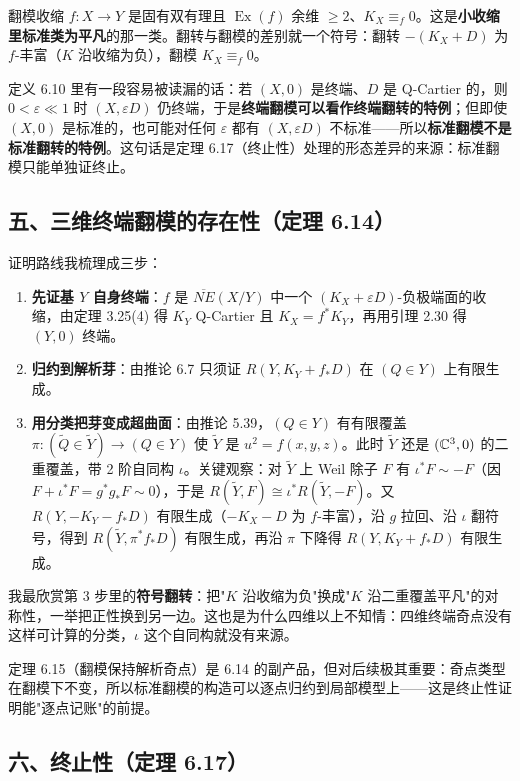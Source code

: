 翻模收缩 $f:X\to Y$ 是固有双有理且 $\operatorname{Ex}(f)$ 余维 $\ge2$、$K_X\equiv_f 0$。这是\textbf{小收缩里标准类为平凡}的那一类。翻转与翻模的差别就一个符号：翻转 $-(K_X+D)$ 为 $f$-丰富（$K$ 沿收缩为负），翻模 $K_X\equiv_f0$。

定义 6.10 里有一段容易被读漏的话：若 $(X,0)$ 是终端、$D$ 是 Q-Cartier 的，则 $0<\varepsilon\ll1$ 时 $(X,\varepsilon D)$ 仍终端，于是\textbf{终端翻模可以看作终端翻转的特例}；但即使 $(X,0)$ 是标准的，也可能对任何 $\varepsilon$ 都有 $(X,\varepsilon D)$ 不标准——所以\textbf{标准翻模不是标准翻转的特例}。这句话是定理 6.17（终止性）处理的形态差异的来源：标准翻模只能单独证终止。

\subsection*{五、三维终端翻模的存在性（定理 6.14）}

证明路线我梳理成三步：

\begin{enumerate}
\item \textbf{先证基 $Y$ 自身终端}：$f$ 是 $\overline{NE}(X/Y)$ 中一个 $(K_X+\varepsilon D)$-负极端面的收缩，由定理 3.25(4) 得 $K_Y$ Q-Cartier 且 $K_X=f^*K_Y$，再用引理 2.30 得 $(Y,0)$ 终端。
\item \textbf{归约到解析芽}：由推论 6.7 只须证 $R(Y,K_Y+f_*D)$ 在 $(Q\in Y)$ 上有限生成。
\item \textbf{用分类把芽变成超曲面}：由推论 5.39，$(Q\in Y)$ 有有限覆盖 $\pi:(\tilde Q\in\tilde Y)\to(Q\in Y)$ 使 $\tilde Y$ 是 $u^2=f(x,y,z)$。此时 $\tilde Y$ 还是 $(\mathbb{C}^3,0)$ 的二重覆盖，带 2 阶自同构 $\iota$。关键观察：对 $\tilde Y$ 上 Weil 除子 $F$ 有 $\iota^*F\sim-F$（因 $F+\iota^*F=g^*g_*F\sim0$），于是 $R(\tilde Y,F)\cong\iota^*R(\tilde Y,-F)$。又 $R(Y,-K_Y-f_*D)$ 有限生成（$-K_X-D$ 为 $f$-丰富），沿 $g$ 拉回、沿 $\iota$ 翻符号，得到 $R(\tilde Y,\pi^*f_*D)$ 有限生成，再沿 $\pi$ 下降得 $R(Y,K_Y+f_*D)$ 有限生成。
\end{enumerate}

我最欣赏第 3 步里的\textbf{符号翻转}：把"$K$ 沿收缩为负"换成"$K$ 沿二重覆盖平凡"的对称性，一举把正性换到另一边。这也是为什么四维以上不知情：四维终端奇点没有这样可计算的分类，$\iota$ 这个自同构就没有来源。

定理 6.15（翻模保持解析奇点）是 6.14 的副产品，但对后续极其重要：奇点类型在翻模下不变，所以标准翻模的构造可以逐点归约到局部模型上——这是终止性证明能"逐点记账"的前提。

\subsection*{六、终止性（定理 6.17）}

